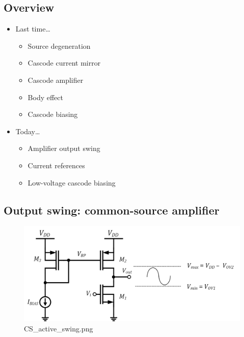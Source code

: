 \documentclass[11pt]{article}
\providecommand{\tightlist}{%
      \setlength{\itemsep}{0pt}\setlength{\parskip}{0pt}}
\begin{document}
    \hypertarget{overview}{%
\subsection{Overview}\label{overview}}

    \begin{itemize}
\tightlist
\item
  Last time\ldots{}

  \begin{itemize}
  \tightlist
  \item
    Source degeneration
  \item
    Cascode current mirror
  \item
    Cascode amplifier
  \item
    Body effect
  \item
    Cascode biasing
  \end{itemize}
\item
  Today\ldots{}

  \begin{itemize}
  \tightlist
  \item
    Amplifier output swing
  \item
    Current references
  \item
    Low-voltage cascode biasing
  \end{itemize}
\end{itemize}

    \hypertarget{output-swing-common-source-amplifier}{%
\subsection{Output swing: common-source
amplifier}\label{output-swing-common-source-amplifier}}

    \begin{figure}
\centering
\includegraphics{CS_active_swing.png}
\caption{CS\_active\_swing.png}
\end{figure}
\end{document}
